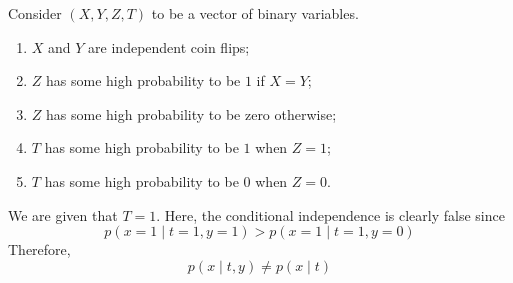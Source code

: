 \documentclass{article}
\numberwithin{equation}{section}
\newcommand{\s}{\hspace{0.1cm}}
\newcommand{\indep}{\s \rotatebox[origin=c]{90}{$\models$}\s }
\theoremstyle{named}
\begin{document}
Consider $(X, Y, Z, T)$ to be a vector of binary variables. 
\begin{enumerate}
        \item $X$ and $Y$ are independent coin flips;
        \item $Z$ has some high probability to be $1$ if $X = Y$;
        \item $Z$ has some high probability to be zero otherwise;
        \item $T$ has some high probability to be $1$ when $Z = 1$;
        \item $T$ has some high probability to be $0$ when $Z = 0$.
\end{enumerate}
We are given that $T = 1$. Here, the conditional independence is clearly false 
since 
\[
        p(x=1 \mid t=1, y=1) > p(x=1 \mid t=1, y=0)
\]
Therefore, 
\[
        p(x \mid t, y) \not= p(x  \mid t)
\]





\end{document}

